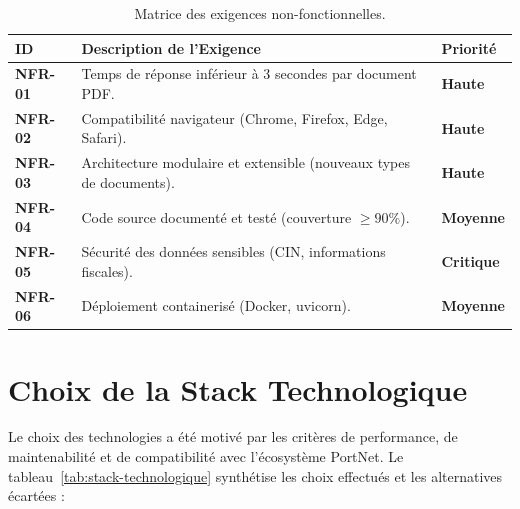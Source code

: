 \begin{table}[H]
\centering
\small
\begin{tabularx}{\textwidth}{@{}>{\bfseries}p{1.5cm} Y >{\bfseries}p{2cm}@{}}
\toprule
{}
ID & Description de l'Exigence & Priorit\'{e} \\
\midrule
NFR-01 & Temps de r\'{e}ponse inf\'{e}rieur \`{a} 3 secondes par document PDF. & Haute \\
NFR-02 & Compatibilit\'{e} navigateur (Chrome, Firefox, Edge, Safari). & Haute \\
NFR-03 & Architecture modulaire et extensible (nouveaux types de documents). & Haute \\
NFR-04 & Code source document\'{e} et test\'{e} (couverture $\geq 90\%$). & Moyenne \\
NFR-05 & S\'{e}curit\'{e} des donn\'{e}es sensibles (CIN, informations fiscales). & Critique \\
NFR-06 & D\'{e}ploiement containeris\'{e} (Docker, uvicorn). & Moyenne \\
\bottomrule
\end{tabularx}
\caption{Matrice des exigences non-fonctionnelles.}
\label{tab:exigences-nfr}
\end{table}

\section{Choix de la Stack Technologique}

Le choix des technologies a \'{e}t\'{e} motiv\'{e} par les crit\`{e}res de performance, de maintenabilit\'{e} et de compatibilit\'{e} avec l'\'{e}cosyst\`{e}me PortNet. Le tableau~\ref{tab:stack-technologique} synth\'{e}tise les choix effectu\'{e}s et les alternatives \'{e}cart\'{e}es :

